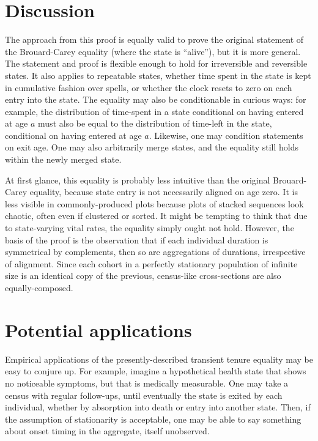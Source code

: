 \documentclass[12pt,oneside,a4paper]{article}
\theoremstyle{definition}
\begin{document}
\section{Discussion}
The approach from this proof is equally valid to prove the
original statement of the Brouard-Carey equality (where the state is ``alive''),
but it is more general.
The statement and proof is flexible enough to hold for irreversible and reversible
states. It also applies to repeatable states, whether time spent in the
state is kept in cumulative fashion over spells, or whether the clock resets to
zero on each entry into the state. The equality may also be conditionable in
curious ways: for example, the distribution of time-spent in a state conditional
on having entered at age $a$ must also be equal to the distribution of time-left in
the state, conditional on having entered at age $a$. Likewise, one may condition
statements on exit age. One may also arbitrarily merge states, and the equality
still holds within the newly merged state.

At first glance, this equality is probably less intuitive than the
original Brouard-Carey equality, because state entry is not necessarily aligned
on age zero. It is less visible in commonly-produced plots because plots of
stacked sequences look chaotic, often even if clustered or sorted. It might
be tempting to think that due to state-varying vital rates, the equality simply ought not hold.
However, the basis of the proof is the observation that if each individual
duration is symmetrical by complements, then so are aggregations of
durations, irrespective of alignment. Since each cohort in a perfectly
stationary population of infinite size is an identical copy of the previous,
census-like cross-sections are also equally-composed.

\section{Potential applications}
Empirical applications of the presently-described transient tenure equality may
be easy to conjure up. For example, imagine a hypothetical health state that
shows no noticeable symptoms, but that is medically measurable. One
may take a census with regular follow-ups, until eventually the state is exited
by each individual, whether by absorption into death or entry into another
state. Then, if the assumption of stationarity is acceptable, one may be able to
say something about onset timing in the aggregate, itself unobserved. %
\end{document}
